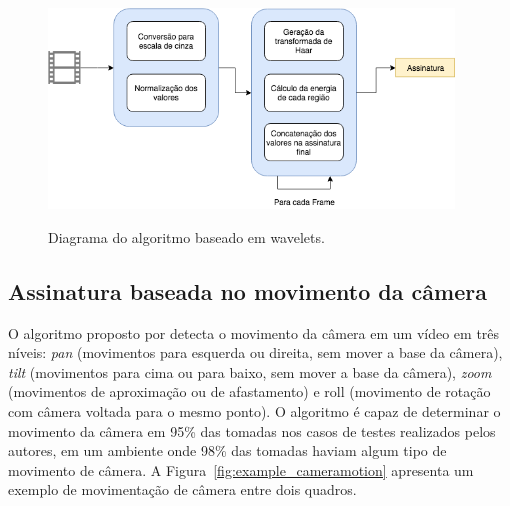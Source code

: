  \begin{figure}[h]
      \centering
      \caption{Diagrama do algoritmo baseado em wavelets.}
      \includegraphics[width=0.96\textwidth]{dados/figuras/diagramas/Diag-Wavelets}
       	\label{fig:dia_wavelet}
    \end{figure}  
    
%
%

\subsection{Assinatura baseada no movimento da câmera}
\label{wavelets}





O algoritmo proposto por  detecta o movimento da câmera em um vídeo em três níveis: \textit{pan} (movimentos para esquerda ou direita, sem mover a base da câmera), \textit{tilt} (movimentos para cima ou para baixo, sem mover a base da câmera), \textit{zoom} (movimentos de aproximação ou de afastamento) e roll (movimento de rotação com câmera voltada para o mesmo ponto). O algoritmo é capaz de determinar o movimento da câmera em 95\% das tomadas nos casos de testes realizados pelos autores, em um ambiente onde 98\% das tomadas haviam algum tipo de movimento de câmera. A Figura~\ref{fig:example_cameramotion} apresenta um exemplo de movimentação de câmera entre dois quadros.

